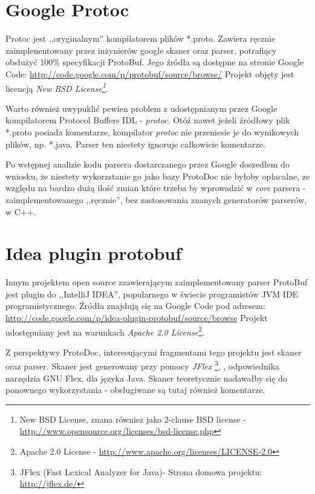 \documentclass[pdflatex,11pt]{aghdpl}
\begin{document}
\section{Google Protoc}

Protoc jest ,,oryginalnym'' kompilatorem plików *.proto. Zawiera ręcznie zaimplenentowany przez inżynierów google skaner oraz parser,
potrafiący obsłużyć 100\% specyfikacji ProtoBuf. Jego źródła są dostępne na stronie Google Code: \href{http://code.google.com/p/protobuf/source/browse/}{http://code.google.com/p/protobuf/source/browse/}
Projekt objęty jest licencją \textit{New BSD License\footnote{New BSD License, znana również jako 2-clause BSD license - \href{http://www.opensource.org/licenses/bsd-license.php}{http://www.opensource.org/licenses/bsd-license.php}}}.

Warto również uwypuklić pewien problem z udostępnianym przez Google kompilatorem Protocol Buffers IDL - \textit{protoc}.
Otóź nawet jeżeli źródłowy plik *.proto posiada komentarze, kompilator \textit{protoc} nie przeniesie je do wynikowych plików, np. *.java.
Parser ten niestety ignoruje całkowicie komentarze. 

Po wstępnej analizie kodu parsera dostarczanego przez Google doszedłem do wniosku, 
że niestety wykorzstanie go jako bazy ProtoDoc nie byłoby opłacalne, ze względu na bardzo dużą ilość zmian które trzeba by wprowadzić w \textit{core} parsera
 - zaimplementowanego ,,ręcznie'', bez zastosowania znanych generatorów parserów, w C++.

\section{Idea plugin protobuf}

Innym projektem open source zzawierającym zaimplementowany parser ProtoBuf jest plugin do ,,IntelliJ IDEA'', popularnego w świecie programistów JVM 
IDE programistycznego. Źródła znajdują się na Google Code pod adresem: \href{http://code.google.com/p/idea-plugin-protobuf/source/browse}{http://code.google.com/p/idea-plugin-protobuf/source/browse}
Projekt udostępniany jest na warunkach \textit{Apache 2.0 License}\footnote{Apache 2.0 License - \href{http://www.apache.org/licenses/LICENSE-2.0}{http://www.apache.org/licenses/LICENSE-2.0}}.

Z perspektywy ProtoDoc, interesującymi fragmentami tego projektu jest skaner oraz parser. 
Skaner jest generowany przy pomocy \textit{JFlex} \footnote{JFlex (Fast Lexical Analyzer for Java)- Strona domowa projektu: \href{http://jflex.de/}{http://jflex.de/}},
, odpowiednika narzędzia GNU Flex, dla języka Java. Skaner teoretycznie nadawałby się do ponownego wykorzystania - obsługiwane są tutaj również komentarze.
\end{document}
